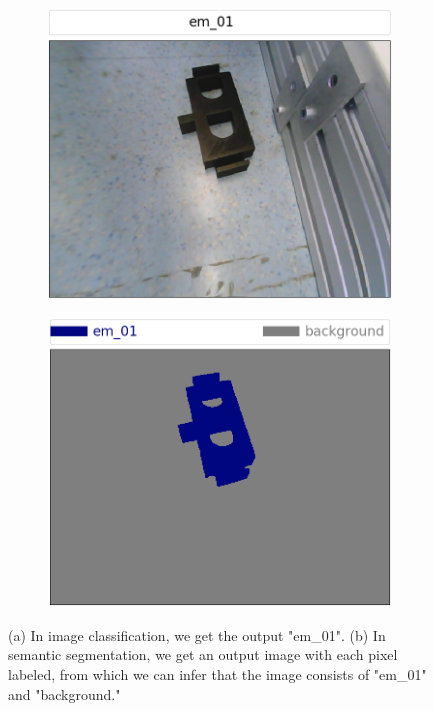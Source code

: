 	\begin{figure}
		\centering
		\begin{subfigure}{.4\textwidth}
			\centering
			\includegraphics[width=1\linewidth]{images/classification}
			\caption{}
			\label{Fig:cls}
		\end{subfigure}
		\begin{subfigure}{.4\textwidth}
			\centering
			\includegraphics[width=1\linewidth]{images/segmentation}
			\caption{}
			\label{Fig:seg}
		\end{subfigure}
		\caption{(a) In image classification, we get the output "em\_01". (b) In semantic segmentation, we get an output image with each pixel labeled, from which we can infer that the image consists of "em\_01" and "background."}
		\label{Fig:clsseg}
	\end{figure}
	
